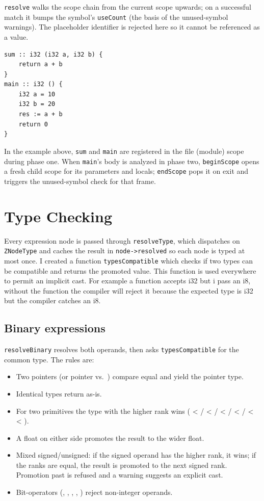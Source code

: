 \texttt{resolve} walks the scope chain from the current scope upwards;
on a successful match it bumps the symbol's \texttt{useCount} (the basis
of the unused-symbol warnings). The placeholder identifier \zn{_} is
rejected here so it cannot be referenced as a value.

\begin{lstlisting}[style=zinc]
sum :: i32 (i32 a, i32 b) {
    return a + b
}
main :: i32 () {
    i32 a = 10
    i32 b = 20
    res := a + b
    return 0
}
\end{lstlisting}

In the example above, \texttt{sum} and \texttt{main} are registered in
the file (module) scope during phase one. When \texttt{main}'s body is
analyzed in phase two, \texttt{beginScope} opens a fresh child scope for
its parameters and locals; \texttt{endScope} pops it on exit and
triggers the unused-symbol check for that frame.

\section{Type Checking}

Every expression node is passed through \texttt{resolveType}, which
dispatches on \texttt{ZNodeType} and caches the result in
\texttt{node->resolved} so each node is typed at most once.
I created a function \texttt{typesCompatible} which checks if two types can be compatible and returns the promoted value. This function is used everywhere to permit an implicit cast. For example a function accepts i32 but i pass an i8, without the function the compiler will reject it because the expected type is i32 but the compiler catches an i8.

\subsection{Binary expressions}

\texttt{resolveBinary} resolves both operands, then asks
\texttt{typesCompatible} for the common type. The rules are:

\begin{itemize}
  \item Two pointers (or pointer vs.\ ) compare equal and yield the pointer type.
  \item Identical types return as-is.
  \item For two primitives the type with the higher rank wins
        ( < / < / < / < / <  < ).
  \item A float on either side promotes the result to the wider float.
  \item Mixed signed/unsigned: if the signed operand has the higher rank, it wins; if the ranks are equal, the result is promoted to the next signed rank. Promotion past  is refused and a warning suggests an explicit cast.
  \item Bit-operators (\zn{&}, \zn{|}, \zn{^}, \zn{<<}, \zn{>>}) reject non-integer operands.
\end{itemize}

